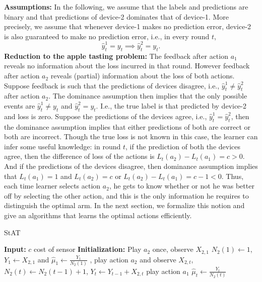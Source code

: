 \documentclass[draft, onecolumn, 12pt]{IEEEtran}
\begin{document}
\noindent
{\bf Assumptions:} In the following, we assume that the labels and predictions are binary and that predictions of device-2 dominates that of device-1. More precisely, we assume that whenever device-1 makes no prediction error, device-2 is also guaranteed to make no prediction error, i.e., in every round $t$, 
\begin{equation}
\label{eqn:DomAssum}
{\hat{y}^1_t=y_t} \implies {\hat{y}^2_t=y_t}.
\end{equation}  
\noindent
{\bf Reduction to the apple tasting problem:}
The feedback after action $a_1$ reveals no information about the loss incurred in that round. However feedback after action $a_2$ reveals (partial) information about the loss of both actions. Suppose feedback is such that the predictions of devices disagree, i.e., ${\hat{y}^1_t\neq\hat{y}^2_t}$ after action $a_2$.  The dominance assumption then implies that the only possible events are $\hat{y}^1_t \neq y_t$ and $\hat{y}^2_t=y_t$. I.e., the true label is that predicted by device-2 and loss is zero. Suppose the predictions of the devices agree, i.e., ${\hat{y}^1_t = \hat{y}^2_t}$, then the dominance assumption implies that either predictions of both are correct or both are incorrect. Though the true loss is not known in this case, the learner can infer some useful knowledge: in round $t$, if the prediction of both the devices agree, then the difference of loss of the actions is $L_t(a_2)-L_t(a_1)=c>0$. And if the predictions of the devices disagree, then dominance assumption implies that $L_t(a_1)=1$ and $L_t(a_2)=c$ or $L_t(a_2)-L_t(a_1)=c-1<0$. Thus, each time learner selects action $a_2$, he gets to know whether or not he was better off by selecting the other action, and this is the only information he requires to distinguish the optimal arm. In the next section, we formalize this notion and give an algorithms that learns the optimal actions efficiently.    

\begin{algorithm}[t]
	\footnotesize
	\caption{StAT}
	\label{Algorithm:Stochastic Apple Tasting}
	\begin{algorithmic}[1]
		\State \textbf{Input:}
		\State $c$ cost of sensor
		\State \textbf{Initialization:}
		\State Play $a_2$ once, observe $X_{2,1}$
		\State $N_{2}(1)\leftarrow 1 $, $Y_1\leftarrow X_{{2,1}}$ and $\hat{\mu}_{1}\leftarrow \frac{Y_1}{N_{2}(1)}$
		,
		\State play action $a_2$ and observe $X_{{2,t}}$,
		\State $N_{2}(t) \leftarrow N_{2}(t-1)+1$, $Y_t\leftarrow Y_{t-1}+X_{{2,t}}$
		\Else
		\State play action $a_1$
		\EndIf
		\State $\hat{\mu}_t \leftarrow \frac{Y_t}{N_2(t)}$
		
		\EndFor 
		
		\Statex
	\end{algorithmic}
\end{algorithm}
\end{document}
